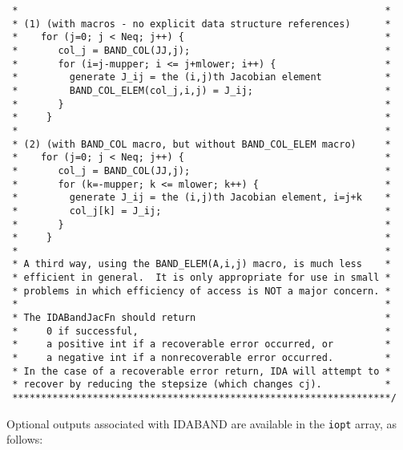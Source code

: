 \begin{verbatim}
 *                                                                *
 * (1) (with macros - no explicit data structure references)      *
 *    for (j=0; j < Neq; j++) {                                   *
 *       col_j = BAND_COL(JJ,j);                                  *
 *       for (i=j-mupper; i <= j+mlower; i++) {                   *
 *         generate J_ij = the (i,j)th Jacobian element           *
 *         BAND_COL_ELEM(col_j,i,j) = J_ij;                       *
 *       }                                                        *
 *     }                                                          *
 *                                                                *
 * (2) (with BAND_COL macro, but without BAND_COL_ELEM macro)     *
 *    for (j=0; j < Neq; j++) {                                   *
 *       col_j = BAND_COL(JJ,j);                                  *
 *       for (k=-mupper; k <= mlower; k++) {                      *
 *         generate J_ij = the (i,j)th Jacobian element, i=j+k    *
 *         col_j[k] = J_ij;                                       *
 *       }                                                        *
 *     }                                                          *
 *                                                                *
 * A third way, using the BAND_ELEM(A,i,j) macro, is much less    *
 * efficient in general.  It is only appropriate for use in small *
 * problems in which efficiency of access is NOT a major concern. *
 *                                                                *
 * The IDABandJacFn should return                                 *
 *     0 if successful,                                           *
 *     a positive int if a recoverable error occurred, or         *
 *     a negative int if a nonrecoverable error occurred.         *
 * In the case of a recoverable error return, IDA will attempt to *
 * recover by reducing the stepsize (which changes cj).           *
 ******************************************************************/

\end{verbatim}
\normalsize

Optional outputs associated with IDABAND are available in the 
{\tt iopt} array, as follows:

